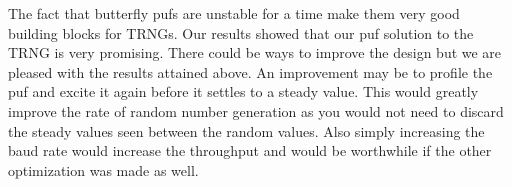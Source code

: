 		The fact that butterfly pufs are unstable for a time make them very good building blocks for TRNGs.  Our results showed that our puf solution to the TRNG is very promising.  There could be ways to improve the design but we are pleased with the results attained above.  An improvement may be to profile the puf and excite it again before it settles to a steady value.  This would greatly improve the rate of random number generation as you would not need to discard the steady values seen between the random values.  Also simply increasing the baud rate would increase the throughput and would be worthwhile if the other optimization was made as well.















